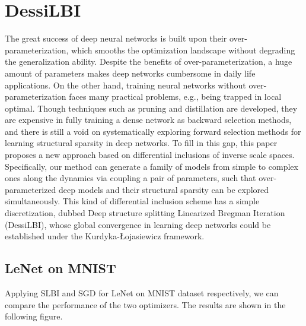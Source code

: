 \documentclass[a4paper, 11pt]{article} %
\begin{document}
\bigskip


\section{\textbf{DessiLBI}}

The great success of deep neural networks is built upon their over-parameterization, which
smooths the optimization landscape without degrading the generalization ability. Despite
the benefits of over-parameterization, a huge amount of parameters makes deep networks
cumbersome in daily life applications. On the other hand, training neural networks without
over-parameterization faces many practical problems, e.g., being trapped in local optimal.
Though techniques such as pruning and distillation are developed, they are expensive in
fully training a dense network as backward selection methods, and there is still a void
on systematically exploring forward selection methods for learning structural sparsity in
deep networks. To fill in this gap, this paper proposes a new approach based on differential
inclusions of inverse scale spaces. Specifically, our method can generate a family of
models from simple to complex ones along the dynamics via coupling a pair of parameters,
such that over-parameterized deep models and their structural sparsity can be explored
simultaneously. This kind of differential inclusion scheme has a simple discretization,
dubbed Deep structure splitting Linearized Bregman Iteration (DessiLBI), whose global
convergence in learning deep networks could be established under the Kurdyka-Łojasiewicz
framework.

\subsection{\textbf{LeNet on MNIST}}

Applying SLBI and SGD for LeNet on MNIST dataset respectively, we can compare the performance
of the two optimizers. The results are shown in the following figure.
\end{document}
